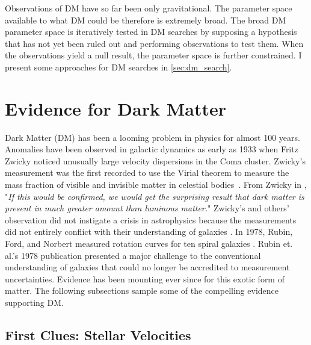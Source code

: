 Observations of DM have so far been only gravitational.
The parameter space available to what DM could be therefore is extremely broad.
The broad DM parameter space is iteratively tested in DM searches by supposing a hypothesis that has not yet been ruled out and performing observations to test them.
When the observations yield a null result, the parameter space is further constrained.
I present some approaches for DM searches in \cref{sec:dm_search}.

\section{Evidence for Dark Matter}\label{sec:evidence4dm}

Dark Matter (DM) has been a looming problem in physics for almost 100 years.
Anomalies have been observed in galactic dynamics as early as 1933 when Fritz Zwicky noticed unusually large velocity dispersions in the Coma cluster.
Zwicky's measurement was the first recorded to use the Virial theorem to measure the mass fraction of visible and invisible matter in celestial bodies~\cite{Hooper:DMHistory}.
From Zwicky in \cite{Zwicky:1933}, "\textit{If this would be confirmed, we would get the surprising result that dark matter is present in much greater amount than luminous matter.}"
Zwicky's and others' observation did not instigate a crisis in astrophysics because the measurements did not entirely conflict with their understanding of galaxies \cite{Hooper:DMHistory}.
In 1978, Rubin, Ford, and Norbert measured rotation curves for ten spiral galaxies \cite{Rubin:1978}.
Rubin et. al.'s 1978 publication presented a major challenge to the conventional understanding of galaxies that could no longer be accredited to measurement uncertainties.
Evidence has been mounting ever since for this exotic form of matter.
The following subsections sample some of the compelling evidence supporting DM.

\subsection{First Clues: Stellar Velocities\label{sec:ev4dm_stars}}

